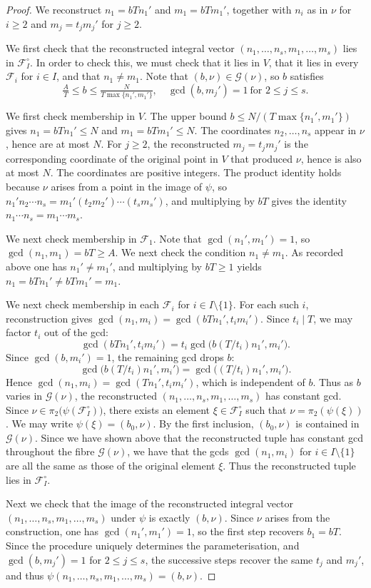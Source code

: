 \begin{proof}
We reconstruct $n_1=bTn_1'$ and $m_1=bTm_1'$, together with $n_i$ as in $\nu$ for $i\geq 2$ and $m_j=t_j m_j'$ for $j\geq 2$.

We first check that the reconstructed integral vector $(n_1,\ldots,n_s,m_1,\ldots,m_s)$ lies in $\mathscr{F}_I^\circ$.
In order to check this, we must check that it lies in $V$, that it lies in every $\mathscr F_i$ for $i\in I$, and that $n_1\neq m_1$.
Note that $(b,\nu)\in \mathscr G(\nu)$, so $b$ satisfies
\[
\tfrac{A}{T}\leq b\leq\tfrac{N}{T\max\{n_1',m_1'\}}, \quad \gcd(b,m_j')=1\ \text{for }2\leq j\leq s.
\]

We first check membership in $V$.
The upper bound $b\leq N/(T\max\{n_1',m_1'\})$ gives $n_1=bTn_1'\leq N$ and $m_1=bTm_1'\leq N$. The coordinates $n_2,\ldots,n_s$ appear in $\nu$, hence are at most $N$. For $j\geq 2$, the reconstructed $m_j=t_j m_j'$ is the corresponding coordinate of the original point in $V$ that produced $\nu$, hence is also at most $N$. The coordinates are positive integers. The product identity  holds because $\nu$ arises from a point in the image of $\psi$, so $n_1'n_2\cdots n_s=m_1'(t_2m_2')\cdots(t_sm_s')$, and multiplying by $bT$ gives the identity $n_1\cdots n_s=m_1\cdots m_s$.

We next check membership in $\mathscr F_1$. Note that $\gcd(n_1',m_1')=1$, so $\gcd(n_1,m_1)=bT\geq A$.
We next check the condition $n_1\neq m_1$. As recorded above one has $n_1'\neq m_1'$, and multiplying by $bT\geq 1$ yields $n_1=bTn_1'\neq bTm_1'=m_1$.

We next check membership in each $\mathscr F_i$ for $i\in I\setminus\{1\}$.
For each such $i$, reconstruction gives $\gcd(n_1,m_i)=\gcd(bTn_1',t_im_i')$.
Since $t_i\mid T$, we may factor $t_i$ out of the gcd:
\[
\gcd(bTn_1',t_im_i')=t_i\gcd\bigl(b(T/t_i)n_1',m_i'\bigr).
\]
Since $\gcd(b,m_i')=1$, the remaining gcd drops $b$:
\[
\gcd\bigl(b(T/t_i)n_1',m_i'\bigr)=\gcd\bigl((T/t_i)n_1',m_i'\bigr).
\]
Hence $\gcd(n_1,m_i)=\gcd(Tn_1',t_im_i')$, which is independent of $b$.
Thus as $b$ varies in $\mathscr{G}(\nu)$, the reconstructed
\allowbreak$(n_1,\ldots,n_s,m_1,\ldots,m_s)$ has constant gcd.
Since $\nu\in \pi_2\bigl(\psi(\mathscr{F}_I^\circ)\bigr)$, there exists an element $\xi\in \mathscr{F}_I^\circ$ such that $\nu=\pi_2(\psi(\xi))$.
We may write $\psi(\xi)=(b_0,\nu)$.
By the first inclusion, $(b_0,\nu)$ is contained in $\mathscr G(\nu)$.
Since we have shown above that the reconstructed tuple has constant gcd throughout the fibre $\mathscr{G}(\nu)$,
we have that the gcds $\gcd(n_1,m_i)$ for $i\in I\setminus\{1\}$ are all the same as those of the original element $\xi$.
Thus the reconstructed tuple lies in $\mathscr{F}_I^\circ$.

Next we check that the image of
the reconstructed integral vector $(n_1,\ldots,n_s,m_1,\ldots,m_s)$ under $\psi$ is exactly $(b,\nu)$.
Since $\nu$ arises from the construction, one has $\gcd(n_1',m_1')=1$, so the first step recovers $b_1=bT$. Since the procedure uniquely determines the parameterisation, and $\gcd(b,m_j')=1$ for $2\leq j\leq s$, the successive steps recover the same $t_j$ and $m_j'$, and thus $\psi(n_1,\ldots,n_s,m_1,\ldots,m_s)=(b,\nu)$.
\end{proof}

